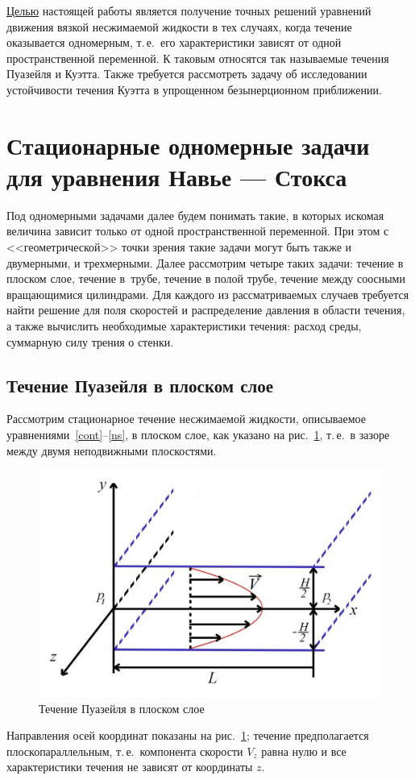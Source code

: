 \documentclass[12pt, a4paper]{article}
\begin{document}
\medskip

\underline{Целью} настоящей работы является получение точных решений уравнений движения вязкой несжимаемой жидкости в тех случаях, когда течение оказывается одномерным, т.\,е.\ его характеристики зависят от одной пространственной переменной. К таковым относятся так называемые течения Пуазейля и Куэтта. Также требуется рассмотреть задачу об исследовании устойчивости течения Куэтта в упрощенном безынерционном приближении.


\section{Стационарные одномерные задачи для уравнения Навье --- Стокса}

Под одномерными задачами далее будем понимать такие, в которых искомая величина зависит только от одной пространственной переменной. При этом с <<геометрической>> точки зрения такие задачи могут быть также и двумерными, и трехмерными. Далее рассмотрим четыре таких задачи: течение в плоском слое, течение в~трубе, течение в полой трубе, течение между соосными вращающимися цилиндрами.
Для каждого из рассматриваемых случаев требуется найти решение для поля скоростей и распределение давления в области течения, а также вычислить необходимые характеристики течения: расход среды, суммарную силу трения о стенки.

\subsection{Течение Пуазейля в плоском слое}
Рассмотрим стационарное течение несжимаемой жидкости, описываемое уравнениями~\eqref{cont}--\eqref{ns}, в плоском слое, как указано на рис.~\ref{planeflow1}, т.\,е.\ в зазоре между двумя неподвижными плоскостями.

\begin{figure}[!h]
\centering
\includegraphics[width=0.45\linewidth]{planeflow1}
\caption{Течение Пуазейля в плоском слое}\label{planeflow1}
\end{figure}

Направления осей координат показаны на рис.~\ref{planeflow1}; течение предполагается плоскопараллельным, т.\,е.\ компонента скорости $V_z$ равна нулю и все характеристики течения не зависят от координаты $z$.
\end{document}
